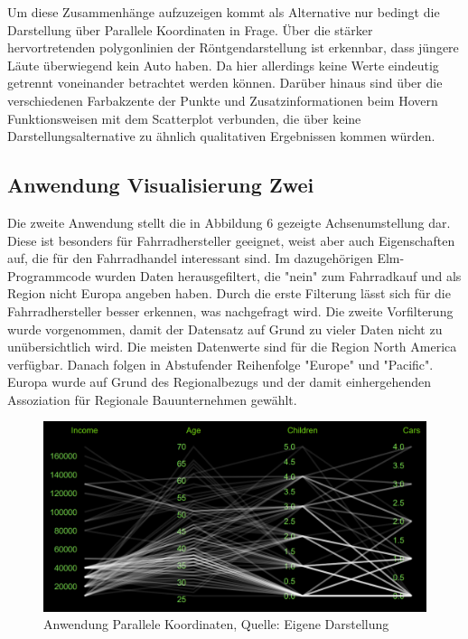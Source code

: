 \documentclass[usegeometry=true]{scrartcl}
\begin{document}
Um diese Zusammenhänge aufzuzeigen kommt als Alternative nur bedingt die Darstellung über Parallele Koordinaten in Frage. Über die stärker hervortretenden polygonlinien der Röntgendarstellung ist erkennbar, dass jüngere Läute überwiegend kein Auto haben. Da hier allerdings keine Werte eindeutig getrennt voneinander betrachtet werden können. Darüber hinaus sind über die verschiedenen Farbakzente der Punkte und Zusatzinformationen beim Hovern Funktionsweisen mit dem Scatterplot verbunden, die über keine Darstellungsalternative zu ähnlich qualitativen Ergebnissen kommen würden.  

\subsection{Anwendung Visualisierung Zwei}
Die zweite Anwendung stellt die in Abbildung 6 gezeigte Achsenumstellung dar. Diese ist besonders für Fahrradhersteller geeignet, weist aber auch Eigenschaften auf, die für den Fahrradhandel interessant sind. Im dazugehörigen Elm-Programmcode wurden Daten herausgefiltert, die "nein" zum Fahrradkauf und als Region nicht Europa angeben haben. Durch die erste Filterung lässt sich für die Fahrradhersteller besser erkennen, was nachgefragt wird. Die zweite Vorfilterung wurde vorgenommen, damit der Datensatz auf Grund zu vieler Daten nicht zu unübersichtlich wird. Die meisten Datenwerte sind für die Region North America verfügbar. Danach folgen in Abstufender Reihenfolge "Europe" und "Pacific". Europa wurde auf Grund des Regionalbezugs und der damit einhergehenden Assoziation für Regionale Bauunternehmen gewählt.
\begin{figure}[h]
\begin{center}
\includegraphics[width=16cm]{Bilder/ParallelCoordsA2.png}
\caption{Anwendung Parallele Koordinaten, Quelle: Eigene Darstellung}
\end{center}
\end{figure}
\end{document}

